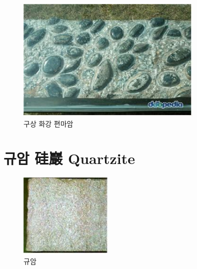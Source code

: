 \documentclass[12pt, a4paper, twoside]{book}
\begin{document}
				\begin{figure}
				\centering
				\caption{구상 화강 편마암}
				\includegraphics[width=0.8\textwidth]{./fig/gneiss_1001.jpg}
				\end{figure}











	\clearpage
	\section{규암  硅巖 Quartzite  }




				\begin{figure}[h]
				\centering
				\caption{규암}
				\includegraphics[width=0.4\textwidth]{./fig/Quartzite_0001.jpg}
				\end{figure}



				\begin{center}
				\end{center}
\end{document}
